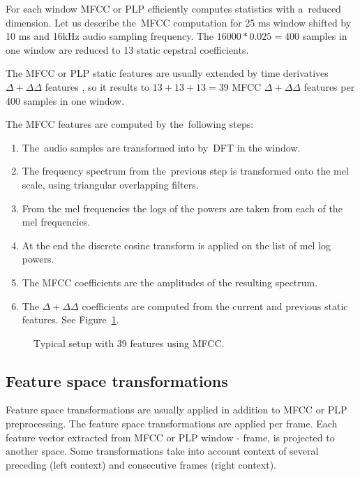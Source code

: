 For each window \ac{MFCC} or \ac{PLP} efficiently computes statistics with a~reduced dimension. 
Let us describe the~\ac{MFCC} computation for 25 ms window shifted by 10 ms and 16kHz audio sampling frequency. 
The $16000 * 0.025 = 400$ samples in one window are reduced to 13 static cepstral coefficients.

The \ac{MFCC} or \ac{PLP} static features are usually extended 
by time derivatives $\Delta+\Delta\Delta$ features \cite{psutka2001comparison},
so it results to $13 + 13 + 13 = 39$ \ac{MFCC} $\Delta+\Delta\Delta$ features 
per 400 samples in one window.

The \ac{MFCC} features are computed by the~following steps:

\small{\begin{enumerate}
    \item The~audio samples are transformed into  by~\ac{DFT} in the window.
    \item The frequency spectrum from the~previous step is transformed onto the mel scale, 
        using triangular overlapping filters.
    \item From the mel frequencies the logs of the powers are taken from each of the mel frequencies.
    \item At the end the discrete cosine transform is applied on the list of mel log powers.
    \item The \ac{MFCC} coefficients are the amplitudes of the resulting spectrum.
    \item The $\Delta+\Delta\Delta$ coefficients are computed from the current and previous static features. See Figure~\ref{fig:delta}.
\end{enumerate}

\begin{figure}
    \begin{center}
    
    \caption{Typical setup with 39 features using \ac{MFCC}.}
    \label{fig:delta} 
    \end{center}
\end{figure}

\subsection*{Feature space transformations}
Feature space transformations are usually applied in addition to \ac{MFCC} or \ac{PLP} preprocessing.
The feature space transformations are applied per frame. 
Each feature vector extracted from \ac{MFCC}
or \ac{PLP} window - frame, is projected to another space.
Some transformations take into account context of several 
preceding (left context) and consecutive frames (right context).

}
